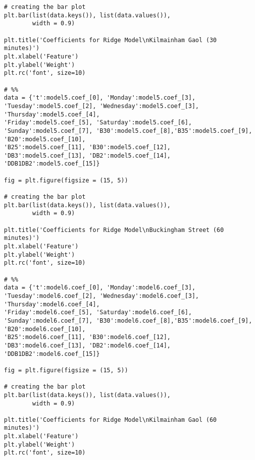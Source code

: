 \begin{verbatim}
# creating the bar plot
plt.bar(list(data.keys()), list(data.values()),
        width = 0.9)

plt.title('Coefficients for Ridge Model\nKilmainham Gaol (30 minutes)')
plt.xlabel('Feature')
plt.ylabel('Weight')
plt.rc('font', size=10)

# %%
data = {'t':model5.coef_[0], 'Monday':model5.coef_[3], 'Tuesday':model5.coef_[2], 'Wednesday':model5.coef_[3], 'Thursday':model5.coef_[4],
'Friday':model5.coef_[5], 'Saturday':model5.coef_[6], 'Sunday':model5.coef_[7], 'B30':model5.coef_[8],'B35':model5.coef_[9], 'B20':model5.coef_[10],
'B25':model5.coef_[11], 'B30':model5.coef_[12], 'DB3':model5.coef_[13], 'DB2':model5.coef_[14], 'DDB1DB2':model5.coef_[15]}

fig = plt.figure(figsize = (15, 5))
 
# creating the bar plot
plt.bar(list(data.keys()), list(data.values()),
        width = 0.9)

plt.title('Coefficients for Ridge Model\nBuckingham Street (60 minutes)')
plt.xlabel('Feature')
plt.ylabel('Weight')
plt.rc('font', size=10)

# %%
data = {'t':model6.coef_[0], 'Monday':model6.coef_[3], 'Tuesday':model6.coef_[2], 'Wednesday':model6.coef_[3], 'Thursday':model6.coef_[4],
'Friday':model6.coef_[5], 'Saturday':model6.coef_[6], 'Sunday':model6.coef_[7], 'B30':model6.coef_[8],'B35':model6.coef_[9], 'B20':model6.coef_[10],
'B25':model6.coef_[11], 'B30':model6.coef_[12], 'DB3':model6.coef_[13], 'DB2':model6.coef_[14], 'DDB1DB2':model6.coef_[15]}

fig = plt.figure(figsize = (15, 5))
 
# creating the bar plot
plt.bar(list(data.keys()), list(data.values()),
        width = 0.9)

plt.title('Coefficients for Ridge Model\nKilmainham Gaol (60 minutes)')
plt.xlabel('Feature')
plt.ylabel('Weight')
plt.rc('font', size=10)



\end{verbatim}

